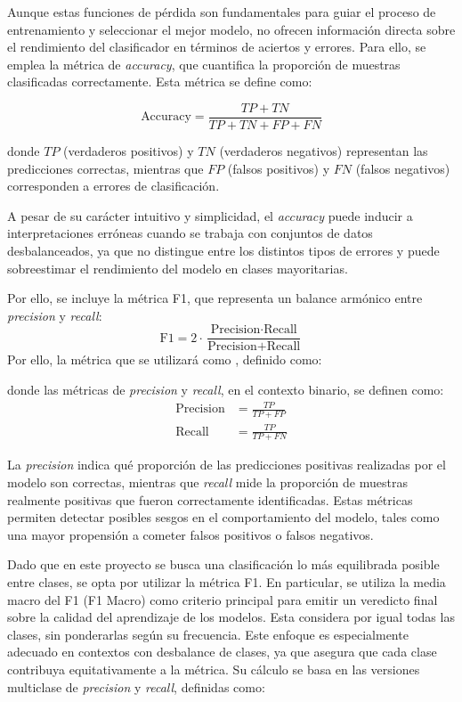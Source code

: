 Aunque estas funciones de pérdida son fundamentales para guiar el proceso de entrenamiento y seleccionar el mejor modelo, no ofrecen información directa sobre el rendimiento del clasificador en términos de aciertos y errores. Para ello, se emplea la métrica de \textit{accuracy}, que cuantifica la proporción de muestras clasificadas correctamente. Esta métrica se define como:

\begin{equation}
\text{Accuracy} = \frac{TP + TN}{TP + TN + FP + FN}
\end{equation}

donde $TP$ (verdaderos positivos) y $TN$ (verdaderos negativos) representan las predicciones correctas, mientras que $FP$ (falsos positivos) y $FN$ (falsos negativos) corresponden a errores de clasificación.

A pesar de su carácter intuitivo y simplicidad, el \textit{accuracy} puede inducir a interpretaciones erróneas cuando se trabaja con conjuntos de datos desbalanceados, ya que no distingue entre los distintos tipos de errores y puede sobreestimar el rendimiento del modelo en clases mayoritarias.

Por ello, se incluye la métrica F1, que representa un balance armónico entre \textit{precision} y \textit{recall}:
\begin{equation}
    \text{F1} = 2 \cdot \frac{\text{Precision} \cdot \text{Recall}}{\text{Precision} + \text{Recall}}
    \end{equation}
    Por ello, la métrica que se utilizará como , definido como:

donde las métricas de \textit{precision} y \textit{recall}, en el contexto binario, se definen como:
\begin{align}
    \text{Precision} &= \frac{TP}{TP + FP} \\
    \text{Recall} &= \frac{TP}{TP + FN}
\end{align}

La \textit{precision} indica qué proporción de las predicciones positivas realizadas por el modelo son correctas, mientras que \textit{recall} mide la proporción de muestras realmente positivas que fueron correctamente identificadas. Estas métricas permiten detectar posibles sesgos en el comportamiento del modelo, tales como una mayor propensión a cometer falsos positivos o falsos negativos.

Dado que en este proyecto se busca una clasificación lo más equilibrada posible entre clases, se opta por utilizar la métrica F1. En particular, se utiliza la media macro del F1 (F1 Macro) como criterio principal para emitir un veredicto final sobre la calidad del aprendizaje de los modelos. Esta considera por igual todas las clases, sin ponderarlas según su frecuencia. Este enfoque es especialmente adecuado en contextos con desbalance de clases, ya que asegura que cada clase contribuya equitativamente a la métrica. Su cálculo se basa en las versiones multiclase de \textit{precision} y \textit{recall}, definidas como:

